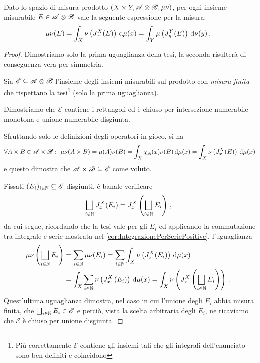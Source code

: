 \begin{proposition}\label{prop:PreTonelli}
	Dato lo spazio di misura prodotto $(X\times Y,\mathscr A\otimes\mathscr B,\mu\nu)$, per ogni insieme misurabile $E\in\mathscr A\otimes\mathscr B$ \sigfin[o] vale la seguente espressione per la misura:
	\begin{equation*}
		\mu\nu(E)=\int_X\nu\left(J_x^X(E)\right)\,\mathrm d\mu(x)=\int_Y\mu\left(J_y^Y(E)\right)\,\mathrm d\nu(y)\, \text{. }
	\end{equation*}
\end{proposition}
\begin{proof}
	\newcommand{\E}{\ensuremath{\mathscr E}}
	Dimostriamo solo la prima uguaglianza della tesi, la seconda risulterà di conseguenza vera per simmetria.
	
	Sia $\E\subseteq \A\otimes\B$ l'insieme degli insiemi misurabili sul prodotto con \emph{misura finita} che rispettano la tesi\footnote{Più correttamente $\E$ contiene gli insiemi tali che gli integrali dell'enunciato sono ben definiti e coincidono} (solo la prima uguaglianza).
	
	Dimostriamo che $\E$ contiene i rettangoli ed è chiuso per intersezione numerabile monotona e unione numerabile disgiunta.
	
	Sfruttando solo le definizioni degli operatori in gioco, si ha
	\begin{equation*}
		\forall A\times B\in\mathscr A\times\mathscr B:\ \mu\nu(A\times B)=\mu(A)\nu(B)=\int_X \chi_A(x)\nu(B)\,\mathrm d\mu(x)=\int_X\nu\left(J_x^X(E)\right)\,\mathrm d\mu(x)
	\end{equation*}
	e questo dimostra che $\A\times\B\subseteq \E$ come voluto.
	
	Fissati $(E_i)_{i\in\N}\subseteq \E$ disgiunti, è banale verificare
	\begin{equation*}
		\bigsqcup_{i\in\mathbb N}J_x^X(E_i)=J_x^X\left(\bigsqcup_{i\in\mathbb N}E_i\right)\, \text{, }
	\end{equation*}
	da cui segue, ricordando che la tesi vale per gli $E_i$ ed applicando la commutazione tra integrale e serie mostrata nel \cref{cor:IntegrazionePerSeriePositive}, l'uguaglianza
	\begin{align*}
		\mu\nu\left(\bigsqcup_{i\in\mathbb N}E_i\right)&=\sum_{i\in\mathbb N}\mu\nu(E_i)=\sum_{i\in\mathbb N}\int_X \nu\left(J_x^X(E_i)\right)\,\mathrm d\mu(x)\\
		&=\int_X\sum_{i\in\mathbb N}\nu\left(J_x^X\left(E_i\right)\right)\,\mathrm d\mu(x)=\int_X\nu\left(J_x^X\left(\bigsqcup_{i\in\mathbb N}E_i\right)\right)\, \text{. }
	\end{align*}
	Quest'ultima uguaglianza dimostra, nel caso in cui l'unione degli $E_i$ abbia misura finita, che $\bigsqcup_{i\in\N}E_i\in\E$ e perciò, vista la scelta arbitraria degli $E_i$, ne ricaviamo che $\E$ è chiuso per unione disgiunta.
	

\end{proof}
